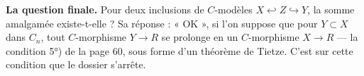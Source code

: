 \documentclass[11pt,a4paper]{article}
\begin{document}
\textbf{La question finale.} Pour deux inclusions de $C$-modèles $X
\hookleftarrow Z \hookrightarrow Y$, la somme amalgamée existe-t-elle ? Sa
réponse : « OK », si l'on suppose que pour $Y \subset X$ dans $C_n$, tout
$C$-morphisme $Y \to R$ se prolonge en un $C$-morphisme $X \to R$ — la
condition 5°) de la page 60, sous forme d'un théorème de Tietze. C'est sur
cette condition que le dossier s'arrête.
\end{document}

